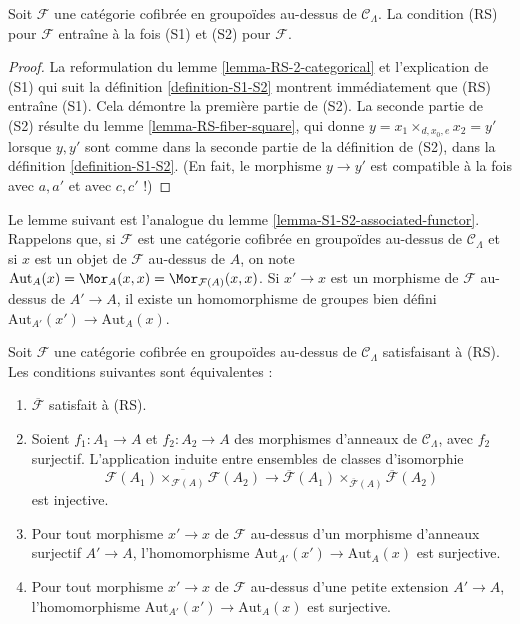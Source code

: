 \begin{lemma}
\label{lemma-RS-implies-S1-S2}
Soit $\mathcal{F}$ une catégorie cofibrée en groupoïdes au-dessus de
$\mathcal{C}_\Lambda$. La condition (RS) pour $\mathcal{F}$ entraîne à la
fois (S1) et (S2) pour $\mathcal{F}$.
\end{lemma}

\begin{proof}
La reformulation du lemme \ref{lemma-RS-2-categorical} et l'explication de
(S1) qui suit la définition \ref{definition-S1-S2} montrent immédiatement que
(RS) entraîne (S1). Cela démontre la première partie de (S2). La seconde partie
de (S2) résulte du lemme \ref{lemma-RS-fiber-square}, qui donne
$y = x_1 \times_{d, x_0, e} x_2 = y'$ lorsque $y, y'$ sont comme dans la
seconde partie de la définition de (S2), dans la définition
\ref{definition-S1-S2}. (En fait, le morphisme $y \to y'$ est compatible à la
fois avec $a, a'$ et avec $c, c'$ !)
\end{proof}

\noindent
Le lemme suivant est l'analogue du lemme
\ref{lemma-S1-S2-associated-functor}. Rappelons que, si $\mathcal{F}$ est une
catégorie cofibrée en groupoïdes au-dessus de $\mathcal{C}_\Lambda$ et si $x$
est un objet de $\mathcal{F}$ au-dessus de $A$, on note
$\text{Aut}_A(x) = \Mor_A(x, x) = \Mor_{\mathcal{F}(A)}(x, x)$.
Si $x' \to x$ est un morphisme de $\mathcal{F}$ au-dessus de $A' \to A$,
il existe un homomorphisme de groupes bien défini
$\text{Aut}_{A'}(x') \to \text{Aut}_A(x)$.

\begin{lemma}
\label{lemma-RS-associated-functor}
Soit $\mathcal{F}$ une catégorie cofibrée en groupoïdes au-dessus de
$\mathcal{C}_\Lambda$ satisfaisant à (RS). Les conditions suivantes sont
équivalentes :
\begin{enumerate}
\item $\overline{\mathcal{F}}$ satisfait à (RS).
\item Soient $f_1: A_1 \to A$ et $f_2: A_2 \to A$ des morphismes
d'anneaux de $\mathcal{C}_\Lambda$, avec $f_2$ surjectif. L'application induite
entre ensembles de classes d'isomorphie
$$
\overline{\mathcal{F}(A_1) \times_{\mathcal{F}(A)} \mathcal{F}(A_2)}
\to \overline{\mathcal{F}}(A_1) \times_{\overline{\mathcal{F}}(A)}
\overline{\mathcal{F}}(A_2)
$$
est injective.
\item Pour tout morphisme $x' \to x$ de $\mathcal{F}$ au-dessus d'un
morphisme d'anneaux surjectif $A' \to A$, l'homomorphisme
$\text{Aut}_{A'}(x') \to \text{Aut}_A(x)$ est surjective.
\item Pour tout morphisme $x' \to x$ de $\mathcal{F}$ au-dessus d'une petite
extension $A' \to A$, l'homomorphisme
$\text{Aut}_{A'}(x') \to \text{Aut}_A(x)$ est surjective.
\end{enumerate}
\end{lemma}

